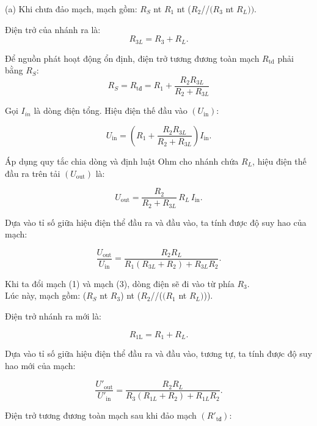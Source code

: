 
(a) Khi chưa đảo mạch, mạch gồm: $R_S$ nt $R_1$ nt ($R_2$//$(R_3$ nt $R_L))$.

Điện trở của nhánh ra là:
\begin{equation}
    R_{3L}=R_3+R_L.
\end{equation}

Để nguồn phát hoạt động ổn định, điện trở tương đương toàn mạch $R_{\text{td}}$ phải bằng $R_S$:
\begin{equation}
    R_S=R_{\text{tđ}}=R_1+\frac{R_2 R_{3L}}{R_2+R_{3L}}
\end{equation}

Gọi $I_{in}$ là dòng điện tổng. Hiệu điện thế đầu vào $(U_{\text{in}})$:

\begin{equation}
      U_{\mathrm{in}}=\left(R_1+\frac{R_2R_{3L}}{R_2+R_{3L}}\right)I_{\mathrm{in}}.
\end{equation}

Áp dụng quy tắc chia dòng và định luật Ohm cho nhánh chứa $R_L$, hiệu điện thế đầu ra trên tải $(U_{\text{out}})$ là:

\begin{equation}
      U_{\mathrm{out}}=\frac{R_2}{R_2+R_{3L}}\,R_L\,I_{\mathrm{in}}.
\end{equation}

Dựa vào tỉ số giữa hiệu điện thể đầu ra và đầu vào, ta tính được độ suy hao của mạch:

\begin{equation}
      \frac{U_{\mathrm{out}}}{U_{\mathrm{in}}}=\frac{R_2R_L}{R_1(R_{3L}+R_2)+R_{3L}R_2}.
\end{equation}

Khi ta đổi mạch (1) và mạch (3), dòng điện sẽ đi vào từ phía $R_3$. \\ Lúc này, mạch gồm: ($R_S$ nt $R_3$) nt ($R_2$//($(R_1$ nt $R_L)$)).

Điện trở nhánh ra mới là:

\begin{equation}
    R_{\mathrm{1L}}=R_1+R_{L}.
\end{equation}

Dựa vào tỉ số giữa hiệu điện thể đầu ra và đầu vào, tương tự, ta tính được độ suy hao mới của mạch:

\begin{equation}
      \frac{U'_{\mathrm{out}}}{U'_{\mathrm{in}}}=\frac{R_2R_L}{R_3(R_{1L}+R_2)+R_{1L}R_2}.
\end{equation}

Điện trở tương đương toàn mạch sau khi đảo mạch $(R'_{\text{tđ}})$: 

